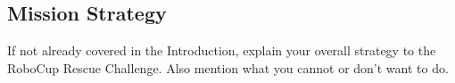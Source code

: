 \subsection{Mission Strategy}
If not already covered in the Introduction, explain your overall strategy to the RoboCup Rescue Challenge. Also mention what you cannot or don't want to do.